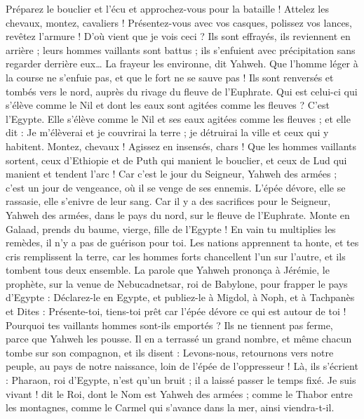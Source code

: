 \begin{multicols}{2}
Préparez le bouclier et l'écu et approchez-vous pour la bataille !
Attelez les chevaux, montez, cavaliers ! Présentez-vous avec vos casques, polissez vos lances, revêtez l'armure !
D'où vient que je vois ceci ? Ils sont effrayés, ils reviennent en arrière ; leurs hommes vaillants sont battus ; ils s'enfuient avec précipitation sans regarder derrière eux… La frayeur les environne, dit Yahweh.
Que l'homme léger à la course ne s'enfuie pas, et que le fort ne se sauve pas ! Ils sont renversés et tombés vers le nord, auprès du rivage du fleuve de l'Euphrate.
Qui est celui-ci qui s'élève comme le Nil et dont les eaux sont agitées comme les fleuves ?
C'est l'Egypte. Elle s'élève comme le Nil et ses eaux agitées comme les fleuves ; et elle dit : Je m'élèverai et je couvrirai la terre ; je détruirai la ville et ceux qui y habitent.
Montez, chevaux ! Agissez en insensés, chars ! Que les hommes vaillants sortent, ceux d'Ethiopie et de Puth qui manient le bouclier, et ceux de Lud qui manient et tendent l'arc !
Car c'est le jour du Seigneur, Yahweh des armées ; c'est un jour de vengeance, où il se venge de ses ennemis. L'épée dévore, elle se rassasie, elle s'enivre de leur sang. Car il y a des sacrifices pour le Seigneur, Yahweh des armées, dans le pays du nord, sur le fleuve de l'Euphrate.
Monte en Galaad, prends du baume, vierge, fille de l'Egypte ! En vain tu multiplies les remèdes, il n'y a pas de guérison pour toi.
Les nations apprennent ta honte, et tes cris remplissent la terre, car les hommes forts chancellent l'un sur l'autre, et ils tombent tous deux ensemble.
La parole que Yahweh prononça à Jérémie, le prophète, sur la venue de Nebucadnetsar, roi de Babylone, pour frapper le pays d'Egypte :
Déclarez-le en Egypte, et publiez-le à Migdol, à Noph, et à Tachpanès et Dites : Présente-toi, tiens-toi prêt car l'épée dévore ce qui est autour de toi !
Pourquoi tes vaillants hommes sont-ils emportés ? Ils ne tiennent pas ferme, parce que Yahweh les pousse.
Il en a terrassé un grand nombre, et même chacun tombe sur son compagnon, et ils disent : Levons-nous, retournons vers notre peuple, au pays de notre naissance, loin de l'épée de l'oppresseur !
Là, ils s'écrient : Pharaon, roi d'Egypte, n'est qu'un bruit ; il a laissé passer le temps fixé.
Je suis vivant ! dit le Roi, dont le Nom est Yahweh des armées ; comme le Thabor entre les montagnes, comme le Carmel qui s'avance dans la mer, ainsi viendra-t-il.

\end{multicols}
